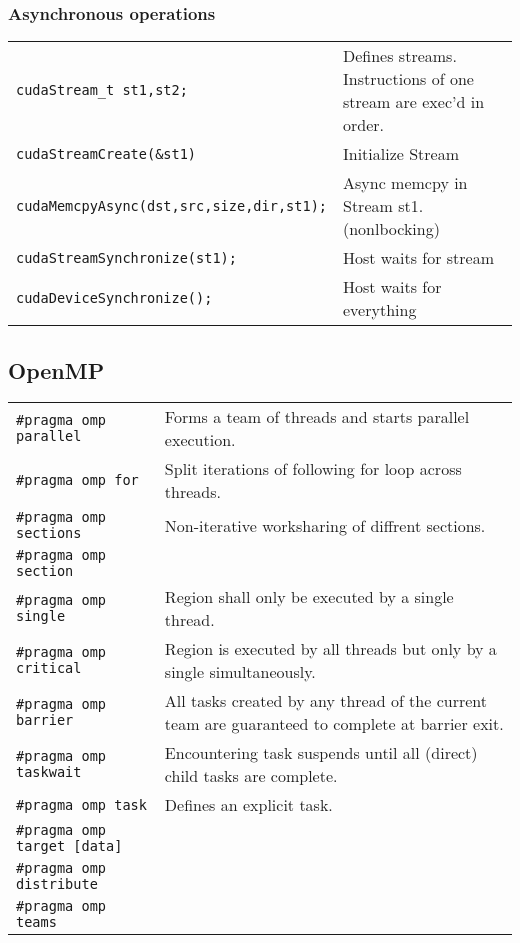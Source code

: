 \documentclass[11pt]{article}
\begin{document}
\subsubsection{Asynchronous operations}
\begin{tabular}{ p{7cm} l }
	\lstinline$cudaStream_t st1,st2;$ & Defines streams. Instructions of one stream are exec'd in order.\\
	\lstinline$cudaStreamCreate(&st1)$& Initialize Stream\\
	\lstinline$cudaMemcpyAsync(dst,src,size,dir,st1);$& Async memcpy in Stream st1. (nonlbocking)\\
	\lstinline$cudaStreamSynchronize(st1);$ & Host waits for stream\\
	\lstinline$cudaDeviceSynchronize();$ & Host waits for everything \\
\end{tabular}

\subsection{OpenMP}

\begin{tabular}{ p{7cm} p{9cm} }
	\lstinline$#pragma omp parallel$ & Forms a team of threads and starts parallel execution. \\
	\lstinline$#pragma omp for$ & Split iterations of following for loop across threads.  \\
	\lstinline$#pragma omp sections$ & Non-iterative worksharing of diffrent sections. \\
	\lstinline$#pragma omp section$ & \\
	\lstinline$#pragma omp single$ & Region shall only be executed by a single thread. \\
	\lstinline$#pragma omp critical$ & Region is executed by all threads but only by a single simultaneously. \\
	\lstinline$#pragma omp barrier$ & All tasks created by any thread of the current team are guaranteed to complete at barrier exit. \\
	\lstinline$#pragma omp taskwait$ & Encountering task suspends until all (direct) child tasks are complete. \\
	\lstinline$#pragma omp task$ & Defines an explicit task. \\
	\lstinline$#pragma omp target [data]$ & \\
	\lstinline$#pragma omp distribute$ & \\
	\lstinline$#pragma omp teams$ & \\ 
\end{tabular}
\end{document}
